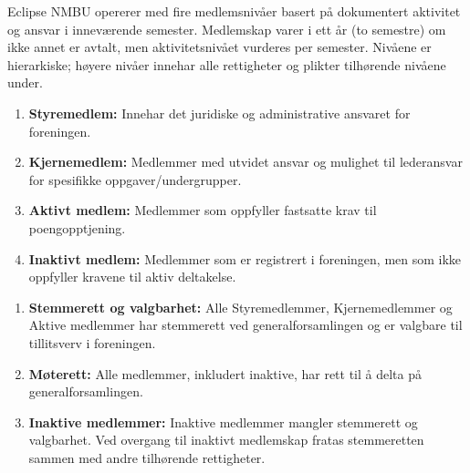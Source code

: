 \documentclass{rapport}
\begin{document}

Eclipse NMBU opererer med fire medlemsnivåer basert på dokumentert aktivitet og ansvar i
inneværende semester. Medlemskap varer i ett år (to semestre) om ikke annet er avtalt, men
aktivitetsnivået vurderes per semester. Nivåene er hierarkiske; høyere nivåer innehar alle
rettigheter og plikter tilhørende nivåene under.
\begin{enumerate}
  \item \textbf{Styremedlem:} Innehar det juridiske og administrative ansvaret for foreningen.
  \item \textbf{Kjernemedlem:} Medlemmer med utvidet ansvar og mulighet til lederansvar for
        spesifikke oppgaver/undergrupper.
  \item \textbf{Aktivt medlem:} Medlemmer som oppfyller fastsatte krav til poengopptjening.
  \item \textbf{Inaktivt medlem:} Medlemmer som er registrert i foreningen, men som ikke oppfyller
        kravene til aktiv deltakelse.
\end{enumerate}

\begin{enumerate}
  \item \textbf{Stemmerett og valgbarhet:} Alle Styremedlemmer, Kjernemedlemmer og Aktive
        medlemmer har stemmerett ved generalforsamlingen og er valgbare til tillitsverv i
        foreningen.
  \item \textbf{Møterett:} Alle medlemmer, inkludert inaktive, har rett til å delta på
        generalforsamlingen.
  \item \textbf{Inaktive medlemmer:} Inaktive medlemmer mangler stemmerett og valgbarhet. Ved
        overgang til inaktivt medlemskap fratas stemmeretten sammen med andre tilhørende
        rettigheter.
\end{enumerate}
\end{document}
